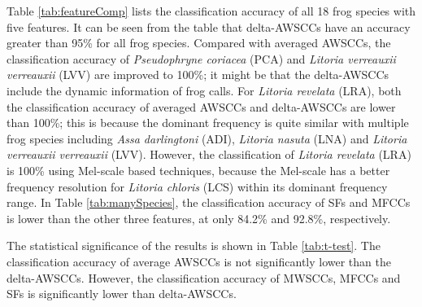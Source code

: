 Table \ref{tab:featureComp} lists the classification accuracy of all 18 frog species with five features. It can be seen from the table that delta-AWSCCs have an accuracy greater than 95\% for all frog species. Compared with averaged AWSCCs, the classification accuracy of \textit{Pseudophryne coriacea} (PCA) and \textit{Litoria verreauxii verreauxii} (LVV) are improved to 100\%; it might be that the delta-AWSCCs include the dynamic information of frog calls. For  \textit{Litoria revelata} (LRA), both the classification accuracy of averaged AWSCCs and delta-AWSCCs are lower than 100\%; this is because the dominant frequency is quite similar with multiple frog species including \textit{Assa darlingtoni} (ADI), \textit{Litoria nasuta} (LNA) and \textit{Litoria verreauxii verreauxii} (LVV). However, the classification of \textit{Litoria revelata} (LRA) is 100\% using Mel-scale based techniques, because the Mel-scale has a better frequency resolution for \textit{Litoria chloris} (LCS) within its dominant frequency range. In Table \ref{tab:manySpecies}, the classification accuracy of SFs and MFCCs is lower than the other three features, at only 84.2\% and 92.8\%, respectively. 


The statistical significance of the results is shown in Table \ref{tab:t-test}. The classification accuracy of average AWSCCs is not significantly lower than the delta-AWSCCs. However, the classification accuracy of MWSCCs, MFCCs and SFs is significantly lower than delta-AWSCCs. 

